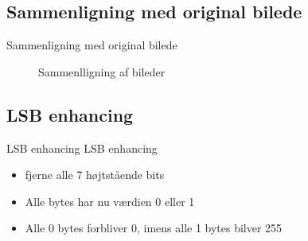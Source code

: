 \subsection{Sammenligning med original bilede}
\begin{frame}{Sammenligning med original bilede}
\begin{figure}
\centering
{}
\end{figure}
\begin{figure}
\centering
{}
\caption{Sammenlligning af bileder}
\end{figure}
\end{frame}

\subsection{LSB enhancing}
\begin{frame}{LSB enhancing}
	LSB enhancing
	\begin{itemize}
		\item fjerne alle 7 højtstående bits
		\item Alle bytes har nu værdien 0 eller 1
		\item Alle 0 bytes forbliver 0, imens alle 1 bytes bilver 255
	\end{itemize}
\end{frame}

